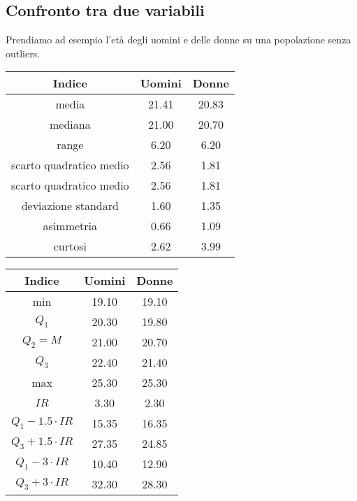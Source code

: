 \documentclass[a4paper]{article}
\theoremstyle{break}
\theoremstyle{break}
\theoremstyle{break}
\theoremstyle{break}
\begin{document}
\subsection{Confronto tra due variabili}
Prendiamo ad esempio l'età degli uomini e delle donne su una popolazione senza outliers.
\begin{table}[H]
	\centering
	\begin{tabular}{|c|c|c|}
		\hline
		Indice                  & Uomini & Donne \\
		\hline
		media                   & 21.41  & 20.83 \\
		mediana                 & 21.00  & 20.70 \\
		range                   & 6.20   & 6.20  \\
		scarto quadratico medio & 2.56   & 1.81  \\
		scarto quadratico medio & 2.56   & 1.81  \\
		deviazione standard     & 1.60   & 1.35  \\
		asimmetria              & 0.66   & 1.09  \\
		curtosi                 & 2.62   & 3.99  \\
		\hline
	\end{tabular}

\end{table}

\begin{table}[H]
	\centering
	\begin{tabular}{|c|c|c|}
		\hline
		Indice                   & Uomini & Donne \\
		\hline
		min                      & 19.10  & 19.10 \\
		\( Q_1 \)                & 20.30  & 19.80 \\
		\( Q_2 = M \)            & 21.00  & 20.70 \\
		\( Q_3 \)                & 22.40  & 21.40 \\
		max                      & 25.30  & 25.30 \\
		\( IR \)                 & 3.30   & 2.30  \\
		\( Q_1 - 1.5 \cdot IR \) & 15.35  & 16.35 \\
		\( Q_3 + 1.5 \cdot IR \) & 27.35  & 24.85 \\
		\( Q_1 - 3 \cdot IR \)   & 10.40  & 12.90 \\
		\( Q_3 + 3 \cdot IR \)   & 32.30  & 28.30 \\
		\hline
	\end{tabular}
\end{table}
\label{D3}
\end{document}
